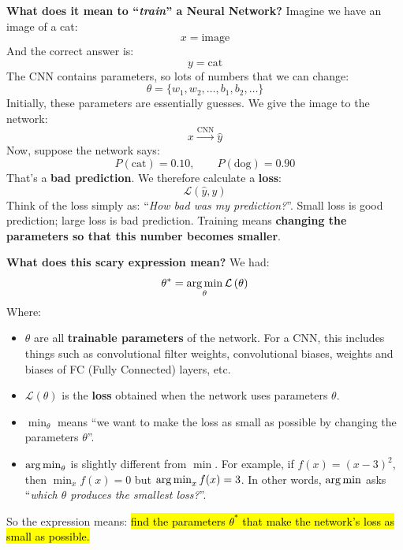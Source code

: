 \begin{remarkbox}
    \textcolor{Green3}{ \textbf{What does it mean to ``\emph{train}'' a Neural Network?}} Imagine we have an image of a cat:
    \begin{equation*}
        x = \text{image}
    \end{equation*}
    And the correct answer is:
    \begin{equation*}
        y = \text{cat}
    \end{equation*}
    The CNN contains parameters, so lots of numbers that we can change:
    \begin{equation*}
        \theta = \{w_1,w_2,\ldots,b_1,b_2,\ldots\}
    \end{equation*}
    Initially, these parameters are essentially guesses.
    We give the image to the network:
    \begin{equation*}
        x
        \xrightarrow{\text{CNN}}
        \hat y
    \end{equation*}
    Now, suppose the network says:
    \begin{equation*}
        P(\text{cat})=0.10,
        \qquad
        P(\text{dog})=0.90
    \end{equation*}
    That's a \textbf{bad prediction}. We therefore calculate a \textbf{loss}:
    \begin{equation*}
        \mathcal{L}(\hat y,y)
    \end{equation*}
    Think of the loss simply as: ``\emph{How bad was my prediction?}''. Small loss is good prediction; large loss is bad prediction. Training means \textbf{changing the parameters so that this number becomes smaller}.

    \highspace
    \textcolor{Green3}{ \textbf{What does this scary expression mean?}} We had:
    \begin{equation*}
        \theta^{*} = \operatorname*{arg\,min}_{\theta} \mathcal{L}\left(\theta\right)
    \end{equation*}
    Where:
    \begin{itemize}
        \item $\theta$ are all \textbf{trainable parameters} of the network. For a CNN, this includes things such as convolutional filter weights, convolutional biases, weights and biases of FC (Fully Connected) layers, etc.
        \item $\mathcal{L}\left(\theta\right)$ is the \textbf{loss} obtained when the network uses parameters $\theta$.
        \item $\min_{\theta}$ means ``we want to make the loss as small as possible by changing the parameters $\theta$''.
        \item $\operatorname*{arg\,min}_{\theta}$ is slightly different from $\min$. For example, if $f(x) = (x-3)^2$, then $\min_x f(x) = 0$ but $\operatorname*{arg\,min}_x f(x) = 3$. In other words, $\operatorname*{arg\,min}$ asks ``\emph{which $\theta$ produces the smallest loss?}''.
    \end{itemize}
    So the expression means: \hl{find the parameters $\theta^{*}$ that make the network's loss as small as possible.}


\end{remarkbox}
